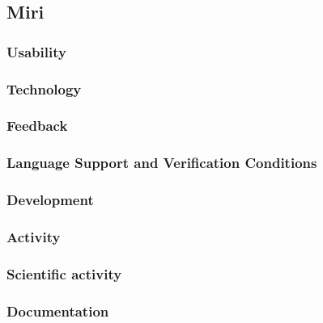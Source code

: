 \subsection{Miri}
\subsubsection{Usability}
\subsubsection{Technology}
\subsubsection{Feedback}
\subsubsection{Language Support and Verification Conditions}
\subsubsection{Development}
\subsubsection{Activity}
\subsubsection{Scientific activity}
\subsubsection{Documentation}
